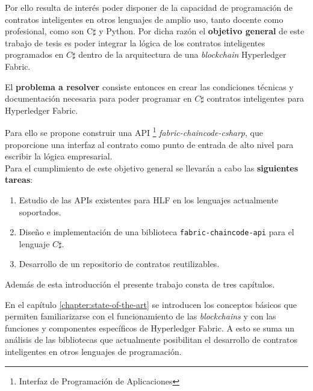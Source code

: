 
Por ello resulta de interés poder disponer de la capacidad de programación de contratos inteligentes en otros lenguajes de amplio uso, tanto docente como profesional, como son C$\sharp$ y Python. Por dicha razón el \textbf{objetivo general} de este trabajo de tesis es poder integrar la lógica de los contratos inteligentes programados en $C\sharp$ dentro de la arquitectura de una \textit{blockchain} Hyperledger Fabric.


El \textbf{problema a resolver} consiste entonces en crear las condiciones técnicas y documentación necesaria para poder programar en $ C\sharp $ contratos inteligentes para Hyperledger Fabric.

Para ello se propone construir una API \footnote{Interfaz de Programación de Aplicaciones} \textit{fabric-chaincode-csharp},  que proporcione una interfaz al contrato como punto de entrada de alto nivel para escribir la lógica empresarial.\\

Para el cumplimiento de este objetivo general se llevarán a cabo las \textbf{siguientes tareas}:

\begin{enumerate}
\item Estudio de las APIs existentes para HLF en  los lenguajes actualmente soportados.
\item Diseño e implementación de una biblioteca \texttt{fabric-chaincode-api} para el lenguaje $ C\sharp $.
\item Desarrollo de un repositorio de contratos reutilizables.
\end{enumerate}

Además de esta introducción el presente trabajo consta de tres capítulos.

En el capítulo \ref{chapter:state-of-the-art} se introducen los conceptos básicos que permiten familiarizarse con el funcionamiento de las \textit{blockchains} y con las funciones y componentes específicos de Hyperledger Fabric. A esto se suma un análisis de las bibliotecas que  actualmente posibilitan el desarrollo de contratos inteligentes en otros lenguajes de programación.

